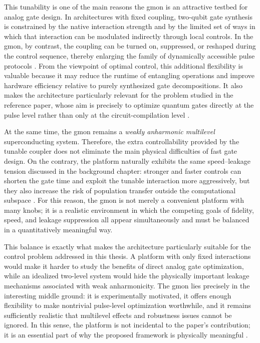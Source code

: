 This tunability is one of the main reasons the gmon is an attractive testbed for analog gate design. In architectures with fixed coupling, two-qubit gate synthesis is constrained by the native interaction strength and by the limited set of ways in which that interaction can be modulated indirectly through local controls. In the gmon, by contrast, the coupling can be turned on, suppressed, or reshaped during the control sequence, thereby enlarging the family of dynamically accessible pulse protocols \cite{Chen2014,Kjaergaard2020}. From the viewpoint of optimal control, this additional flexibility is valuable because it may reduce the runtime of entangling operations and improve hardware efficiency relative to purely synthesized gate decompositions. It also makes the architecture particularly relevant for the problem studied in the reference paper, whose aim is precisely to optimize quantum gates directly at the pulse level rather than only at the circuit-compilation level \cite{Niu2019}.

At the same time, the gmon remains a \emph{weakly anharmonic multilevel} superconducting system. Therefore, the extra controllability provided by the tunable coupler does not eliminate the main physical difficulties of fast gate design. On the contrary, the platform naturally exhibits the same speed--leakage tension discussed in the background chapter: stronger and faster controls can shorten the gate time and exploit the tunable interaction more aggressively, but they also increase the risk of population transfer outside the computational subspace \cite{Krantz2019,Niu2019}. For this reason, the gmon is not merely a convenient platform with many knobs; it is a realistic environment in which the competing goals of fidelity, speed, and leakage suppression all appear simultaneously and must be balanced in a quantitatively meaningful way.

This balance is exactly what makes the architecture particularly suitable for the control problem addressed in this thesis. A platform with only fixed interactions would make it harder to study the benefits of direct analog gate optimization, while an idealized two-level system would hide the physically important leakage mechanisms associated with weak anharmonicity. The gmon lies precisely in the interesting middle ground: it is experimentally motivated, it offers enough flexibility to make nontrivial pulse-level optimization worthwhile, and it remains sufficiently realistic that multilevel effects and robustness issues cannot be ignored. In this sense, the platform is not incidental to the paper's contribution; it is an essential part of why the proposed framework is physically meaningful \cite{Chen2014,Niu2019}.

